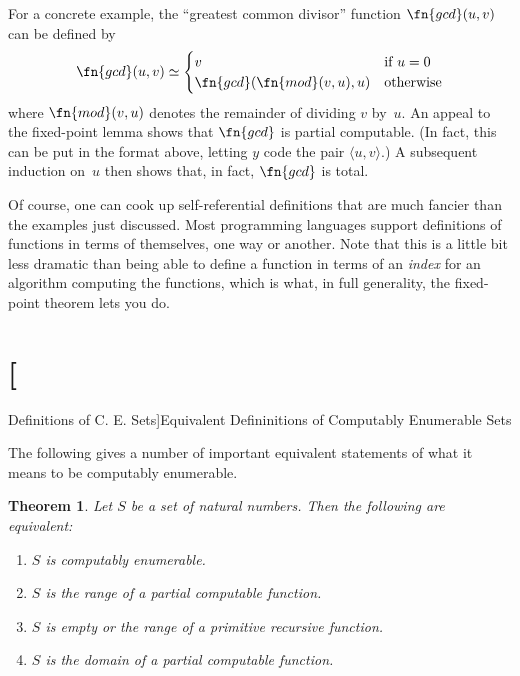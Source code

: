 \documentclass[10pt,a4paper]{article}
\theoremstyle{plain}
\newtheorem{thm}{Theorem}[section]
\theoremstyle{definition}
\theoremstyle{remark}
\newcommand*{\olfileid}[3]{}
\newcommand*{\olsection}[1]{\section*{#1}}
\newcommand*{\ollabel}[1]{\label{#1}}
\providecommand{\tuple}[1]{\langle #1 \rangle}
\begin{document}
For a concrete example, the ``greatest common divisor'' function
$\fn{gcd}(u,v)$ can be defined by
\[
\fn{gcd}(u,v) \simeq
\begin{cases}
v & \text{if $u = 0$} \\
\fn{gcd}(\fn{mod}(v, u), u) & \text{otherwise}
\end{cases}
\]
where $\fn{mod}(v, u)$ denotes the remainder of dividing $v$
by~$u$. An appeal to the fixed-point lemma shows that $\fn{gcd}$ is
partial computable. (In fact, this can be put in the format above,
letting $y$ code the pair $\tuple{u, v}$.) A subsequent induction
on~$u$ then shows that, in fact, $\fn{gcd}$ is total.

Of course, one can cook up self-referential definitions that are much
fancier than the examples just discussed. Most programming languages
support definitions of functions in terms of themselves, one way or
another. Note that this is a little bit less dramatic than being able
to define a function in terms of an \emph{index} for an algorithm
computing the functions, which is what, in full generality, the
fixed-point theorem lets you do.





\olfileid{cmp}{thy}{eqc}

\olsection[Definitions of C. E. Sets]{Equivalent Defininitions of
  Computably Enumerable Sets}


The following gives a number of important equivalent statements of
what it means to be computably enumerable.

\begin{thm}
\ollabel{thm:ce-equiv}
Let $S$ be a set of natural numbers. Then the following are
equivalent:
\begin{enumerate}
\item\ollabel{case:ce} $S$ is computably enumerable.
\item\ollabel{case:ran-pc} $S$ is the range of a \emph{partial} computable function.
\item\ollabel{case:ran-prim} $S$ is empty or the range of a primitive recursive function.
\item\ollabel{case:ce-domain} $S$ is the \emph{domain} of a partial computable function.
\end{enumerate}
\end{thm}
\end{document}
